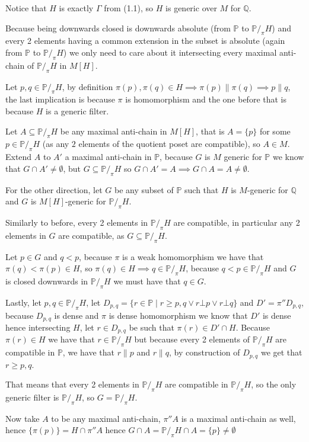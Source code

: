\begin{cExercise}
\begin{cPart}
		Notice that $H$ is exactly $\Gamma$ from (1.1), so $H$ is generic over $M$ for $\mathbb Q$.
		
		Because being downwards closed is downwards absolute (from $\mathbb P$ to $\mathbb P/_\pi H$) and every 2 elements having a common extension in the subset is absolute (again from $\mathbb P$ to $\mathbb P/_\pi H$) we only need to care about it intersecting every maximal anti-chain of $\mathbb P/_\pi H$ in $M[H]$.
		
		Let $p,q\in\mathbb P/_\pi H$, by definition $\pi(p),\pi(q)\in H\implies \pi(p)\|\pi(q)\implies p\|q$, the last implication is because $\pi$ is homomorphism and the one before that is because $H$ is a generic filter.
		
		Let $A\subseteq \mathbb P/_\pi H$ be any maximal anti-chain in $M[H]$, that is $A=\{p\}$ for some $p\in\mathbb P/_\pi H$ (as any $2$ elements of the quotient poset are compatible), so $A\in M$. Extend $A$ to $A'$ a maximal anti-chain in $\mathbb P$, because $G$ is $M$ generic for $\mathbb P$ we know that $G\cap A'\ne\emptyset$, but $G\subseteq \mathbb P/_\pi H$ so $G\cap A'=A\implies G\cap A=A\ne\emptyset$.
		
		For the other direction, let $G$ be any subset of $\mathbb P$ such that $H$ is $M$-generic for $\mathbb Q$ and $G$ is $M[H]$-generic for $\mathbb P/_\pi H$.
		
		Similarly to before, every 2 elements in $\mathbb P/_\pi H$ are compatible, in particular any 2 elements in $G$ are compatible, as $G\subseteq \mathbb P/_\pi H$.
		
		Let $p\in G$ and $q<p$, because $\pi$ is a weak homomorphism we have that $\pi(q)<\pi(p)\in H$, so $\pi(q)\in H\implies q\in \mathbb P/_\pi H$, because $q<p\in \mathbb P/_\pi H$ and $G$ is closed downwards in $\mathbb P/_\pi H$ we must have that $q\in G$.
		
		Lastly, let $p,q\in \mathbb P/_\pi H$, let $D_{p,q}=\{r\in \mathbb P\mid r\ge p,q\lor r\bot p\lor r\bot q\}$ and $D'=\pi''D_{p,q}$, because $D_{p,q}$ is dense and $\pi$ is dense homomorphism we know that $D'$ is dense hence intersecting $H$, let $r\in D_{p,q}$ be such that $\pi(r)\in D'\cap H$. Because $\pi(r)\in H$ we have that $r\in \mathbb P/_\pi H$ but because every 2 elements of $\mathbb P/_\pi H$ are compatible in $\mathbb P$, we have that $r\| p$ and $r\| q$, by construction of $D_{p,q}$ we get that $r\ge p,q$.
		
		That means that every 2 elements in $\mathbb P/_\pi H$ are compatible in $\mathbb P/_\pi H$, so the only generic filter is $\mathbb P/_\pi H$, so $G=\mathbb P/_\pi H$.
		
		Now take $A$ to be any maximal anti-chain, $\pi''A$ is a maximal anti-chain as well, hence $\{\pi(p)\}=H\cap \pi''A$ hence $G\cap A=\mathbb P/_\pi H\cap A=\{p\}\ne\emptyset$
	\end{cPart}
\end{cExercise}

